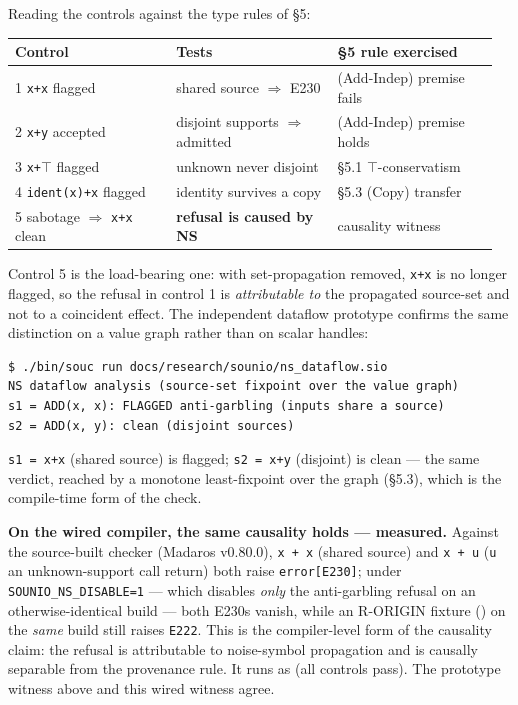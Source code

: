 \documentclass[sigplan,review,anonymous,10pt]{acmart}
\begin{document}
Reading the controls against the type rules of §5:

\begin{table}[htbp]\centering\small
\begin{tabular}{p{0.32\linewidth}p{0.32\linewidth}p{0.32\linewidth}}
\toprule
Control & Tests & §5 rule exercised \\
\midrule
1 \texttt{x+x} flagged & shared source $\Rightarrow$ E230 & (Add-Indep) premise fails \\
2 \texttt{x+y} accepted & disjoint supports $\Rightarrow$ admitted & (Add-Indep) premise holds \\
3 \texttt{x+$\top$} flagged & unknown never disjoint & §5.1 \texttt{$\top$}-conservatism \\
4 \texttt{ident(x)+x} flagged & identity survives a copy & §5.3 (Copy) transfer \\
5 sabotage $\Rightarrow$ \texttt{x+x} clean & \textbf{refusal is caused by NS} & causality witness \\
\bottomrule
\end{tabular}
\end{table}

Control 5 is the load-bearing one: with set-propagation removed, \texttt{x+x} is no longer flagged, so the refusal in control 1 is \emph{attributable to} the propagated source-set and not to a coincident effect. The independent dataflow prototype confirms the same distinction on a value graph rather than on scalar handles:

\begin{lstlisting}
$ ./bin/souc run docs/research/sounio/ns_dataflow.sio
NS dataflow analysis (source-set fixpoint over the value graph)
s1 = ADD(x, x): FLAGGED anti-garbling (inputs share a source)
s2 = ADD(x, y): clean (disjoint sources)
\end{lstlisting}

\texttt{s1 = x+x} (shared source) is flagged; \texttt{s2 = x+y} (disjoint) is clean --- the same verdict, reached by a monotone least-fixpoint over the graph (§5.3), which is the compile-time form of the check.

\textbf{On the wired compiler, the same causality holds --- measured.} Against the source-built checker (Madaros v0.80.0), \texttt{x + x} (shared source) and \texttt{x + u} (\texttt{u} an unknown-support call return) both raise \texttt{error[E230]}; under \texttt{SOUNIO\_NS\_DISABLE=1} --- which disables \emph{only} the anti-garbling refusal on an otherwise-identical build --- both E230s vanish, while an R-ORIGIN fixture () on the \emph{same} build still raises \texttt{E222}. This is the compiler-level form of the causality claim: the refusal is attributable to noise-symbol propagation and is causally separable from the provenance rule. It runs as  (all controls pass). The prototype witness above and this wired witness agree.
\end{document}
